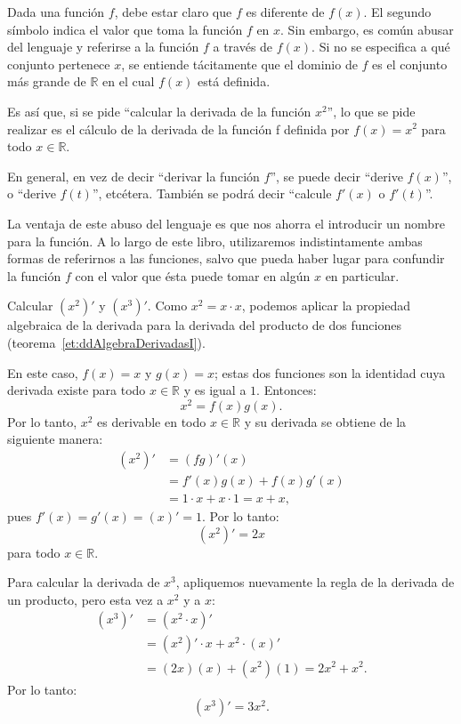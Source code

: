 Dada una función $f$, debe estar claro que $f$ es diferente de $f(x)$. El segundo símbolo indica el
valor que toma la función $f$ en $x$. Sin embargo, es común abusar del lenguaje y referirse a la
función $f$ a través de $f(x)$. Si no se especifica a qué conjunto pertenece $x$, se entiende
tácitamente que el dominio de $f$ es el conjunto más grande de $\mathbb{R}$ en el cual $f(x)$ está
definida.

Es así que, si se pide ``calcular la derivada de la función $x^2$'', lo que se pide realizar es el
cálculo de la derivada de la función f definida por $f(x) = x^2$ para todo $x\in\mathbb{R}$.

En general, en vez de decir ``derivar la función $f$'', se puede decir ``derive $f(x)$'', o
``derive $f(t)$'', etcétera. También se podrá decir ``calcule $f'(x)$ o $f'(t)$''.

La ventaja de este abuso del lenguaje es que nos ahorra el introducir un nombre para la función. A
lo largo de este libro, utilizaremos indistintamente ambas formas de referirnos a las funciones,
salvo que pueda haber lugar para confundir la función $f$ con el valor que ésta puede tomar en
algún $x$ en particular.

\begin{exemplo}[Solución]{%
Calcular $(x^2)'$ y $(x^3)'$.
}%
Como $x^2 = x \cdot x$, podemos aplicar la propiedad algebraica de la derivada para la derivada del
producto de dos funciones (teorema~\ref{et:ddAlgebraDerivadasI}).

En este caso, $f(x) = x$ y $g(x) = x$; estas dos funciones son la identidad cuya derivada existe
para todo $x\in\mathbb{R}$ y es igual a $1$. Entonces:
\[
x^2 = f(x)g(x).
\]
Por lo tanto, $x^2$ es derivable en todo $x\in\mathbb{R}$ y su derivada se obtiene de la siguiente
manera:
\begin{align*}
(x^2)' &= (fg)'(x) \\
  &= f'(x)g(x)+ f(x)g'(x)\\
  &= 1\cdot x + x\cdot 1 = x + x,
\end{align*}
  pues $f'(x) = g'(x) = (x)' = 1$. Por lo tanto:
\[
  (x^2)' = 2x
\]
para todo $x\in\mathbb{R}$.

Para calcular la derivada de $x^3$, apliquemos nuevamente la regla de la derivada de un producto,
pero esta vez a $x^2$ y a $x$:
\begin{align*}
(x^3)' &= (x^2 \cdot x)'\\
  &= (x^2)' \cdot x + x^2 \cdot (x)' \\
  &= (2x)(x) + (x^2)(1) = 2x^2 + x^2.
\end{align*}
Por lo tanto:
\[
(x^3)' = 3x^2.
\]
\end{exemplo}

